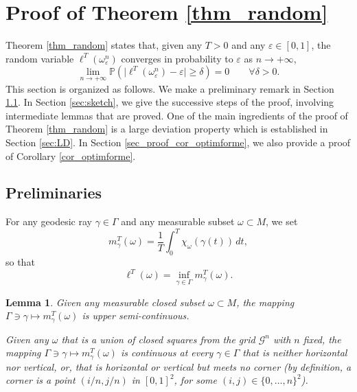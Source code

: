 \documentclass[10pt]{amsart}
\newtheorem{lemma}{Lemma}
\theoremstyle{definition}
\begin{document}
\section{Proof of Theorem \ref{thm_random}}\label{sec_random}
Theorem \ref{thm_random} states that, given any $T>0$ and any $ \varepsilon \in [0, 1]$, the random variable $\ell^T(\omega_\varepsilon^n)$ converges in probability to $\varepsilon$ as $n\to +\infty$, \ie
\[
\lim_{n\to +\infty}\mathbb{P}\left(\vert\ell^T(\omega_\varepsilon^n) - \varepsilon \vert \geq \delta\right) = 0 \qquad \forall \delta>0.
\]
This section is organized as follows.
We make a preliminary remark in Section \ref{sec_prelim}.
In Section \ref{sec:sketch}, we give the successive steps of the proof, involving intermediate lemmas that are proved. One of the main ingredients of the proof of Theorem \ref{thm_random} is a large deviation property which is established in Section \ref{sec:LD}.
In Section \ref{sec_proof_cor_optimforme}, we also provide a proof of Corollary \ref{cor_optimforme}.

\subsection{Preliminaries}\label{sec_prelim}
For any geodesic ray $\gamma\!\in\!\Gamma$ and any measurable subset $\omega\!\subset\!M$, we set\vspace*{-3pt}
\begin{equation*}
m^T_\gamma(\omega) = \frac{1}{T}\int_0^T\chi_\omega(\gamma(t))\, dt,
\end{equation*}
so that\vspace*{-3pt}
\begin{equation}\label{lTmT}
\ell^T(\omega) = \inf_{\gamma \in \Gamma} m^T_\gamma(\omega).
\end{equation}

\begin{lemma}\label{lem3hv}
Given any measurable {closed} subset $\omega\subset M$, the mapping $\Gamma\ni \gamma \mapsto m^T_\gamma(\omega)$ is upper semi-continuous.

Given any $\omega$ that is a union of {closed} squares from the grid $\mathcal{G}^n$ with $n$ fixed, the mapping $\Gamma\ni \gamma \mapsto m^T_\gamma(\omega)$ is continuous at every $\gamma\in\Gamma$ that is neither horizontal nor vertical, or, that is horizontal {or} vertical but meets no corner (by definition, a corner is a point $(i/n,j/n)$ in $[0,1]^2$, for some $(i,j)\in\{0,\ldots,n\}^2$).
\end{lemma}
\end{document}
